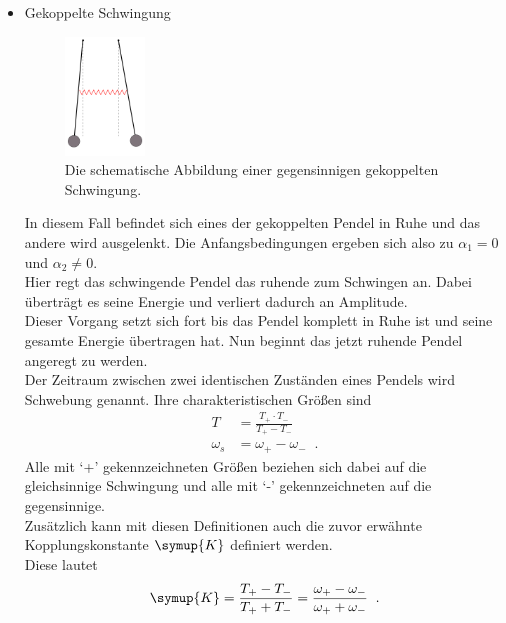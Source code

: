 \begin{itemize}
    \item {\Large Gekoppelte Schwingung\\}{
        \begin{figure}[H]
            \centering
            \includegraphics[width=0.2\textwidth]{latex/images/schwing3.PNG}
            \caption{Die schematische Abbildung einer gegensinnigen gekoppelten Schwingung\protect \cite{V106}.}
            \label{img:3}
        \end{figure}
        \noindent In diesem Fall befindet sich eines der gekoppelten Pendel in Ruhe und das andere wird ausgelenkt.
        Die Anfangsbedingungen ergeben sich also zu $\alpha_1=0$ und $\alpha_2 \neq 0$.\\
        Hier regt das schwingende Pendel das ruhende zum Schwingen an. Dabei überträgt es seine Energie und verliert dadurch an Amplitude.\\
        Dieser Vorgang setzt sich fort bis das Pendel komplett in Ruhe ist und seine gesamte Energie übertragen hat. Nun beginnt das jetzt ruhende Pendel angeregt zu werden.\\
        Der Zeitraum zwischen zwei identischen Zuständen eines Pendels wird Schwebung genannt. Ihre charakteristischen Größen sind
        \begin{align*}
            T&=\frac{T_+ \cdot T_-}{T_+ - T_-} \\
            \omega_s&= \omega_+ -\omega_-\; \; \text{.}
        \end{align*} 
        Alle mit \enquote*{+} gekennzeichneten Größen beziehen sich dabei auf die gleichsinnige Schwingung und alle mit \enquote*{-} gekennzeichneten auf die gegensinnige.\\
        Zusätzlich kann mit diesen Definitionen auch die zuvor erwähnte Kopplungskonstante $\symup{K}$ definiert werden.\\
        Diese lautet
        \begin{equation*}
            \symup{K}=\frac{T_+ - T_-}{T_+ + T_-}=\frac{\omega_+ -\omega_-}{\omega_+ + \omega_-}\; \; \text{.}
        \end{equation*}

        
        }
\end{itemize}




